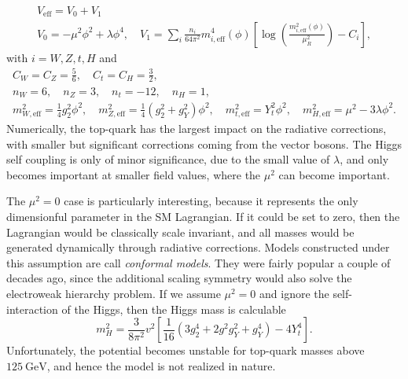 \begin{equation}
\begin{gathered}
V_\text{eff} = V_0 + V_1\\
V_0 = - \mu^2 \phi^2 + \lambda \phi^4, \quad V_1 = \sum_{i} \frac{n_i}{64 \pi^2} m_{i, \text{eff}}^4(\phi) \left[ \log\! \left( \frac{m_{i, \text{eff}}^2 (\phi)}{\mu_R^2} \right) - C_i \right],
\end{gathered}
\end{equation}
with $i = W,Z, t, H$ and
\begin{equation}
\begin{gathered}
C_W = C_Z = \frac{5}{6}, \quad C_t = C_H = \frac{3}{2}, \\
n_W = 6, \quad n_Z = 3, \quad n_t = -12, \quad n_H = 1, \\
m_{W, \text{eff}}^2 = \frac{1}{4} g_2^2 \phi^2, \quad m_{Z, \text{eff}}^2 = \frac{1}{4} \left(g_2^2 + g_Y^2 \right) \phi^2, \quad m_{t, \text{eff}}^2 = Y_t^2 \phi^2, \quad m_{H, \text{eff}}^2 = \mu^2 - 3 \lambda \phi^2.
\end{gathered}
\label{eq:2:Veff_params}
\end{equation}
Numerically, the top-quark has the largest impact on the radiative corrections, with smaller but significant corrections coming from the vector bosons. The Higgs self coupling is only of minor significance, due to the small value of $\lambda$, and only becomes important at smaller field values, where the $\mu^2$ can become important.

The $\mu^2 = 0$ case is particularly interesting, because it represents the only dimensionful parameter in the \acs{SM} Lagrangian. If it could be set to zero, then the Lagrangian would be classically scale invariant, and all masses would be generated dynamically through radiative corrections. Models constructed under this assumption are call \textit{conformal models}. They were fairly popular a couple of decades ago, since the additional scaling symmetry would also solve the electroweak hierarchy problem. If we assume $\mu^2 = 0$ and ignore the self-interaction of the Higgs, then the Higgs mass is calculable
\begin{equation}
m_H^2 = \frac{3}{8 \pi^2}v^2 \left[ \frac{1}{16} (3 g_2^4 + 2 g^2 g_Y^2 + g_Y^4) - 4 Y_t^4 \right] .
\end{equation}
Unfortunately, the potential becomes unstable for top-quark masses above $125\ \mathrm{GeV}$, and hence the model is not realized in nature.

